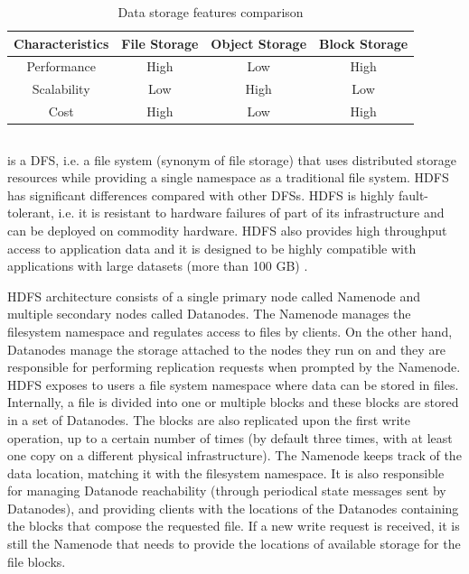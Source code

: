 \begin{table}[!ht]
    \begin{center}
      \caption{Data storage features comparison}
      \label{tab:storagecomparison}
      \begin{tabular}{cccc} %
        \toprule
        \textbf{Characteristics}\Tstrut\Bstrut & \textbf{File Storage} & \textbf{Object Storage} & \textbf{Block Storage}\\
        \midrule
        Performance & High & Low & High\Tstrut\\
        Scalability & Low & High & Low\\
        Cost & High & Low & High\Bstrut\\
        \bottomrule
      \end{tabular}
    \end{center}
\end{table}

\subsection{}

 is a \gls{DFS}, i.e. a file system (synonym of file storage) that uses distributed storage resources while providing a single namespace as a traditional file system. \gls{HDFS} has significant differences compared with other \glspl{DFS}. \gls{HDFS} is highly fault-tolerant, i.e. it is resistant to hardware failures of part of its infrastructure and can be deployed on commodity hardware. \gls{HDFS} also provides high throughput access to application data and it is designed to be highly compatible with applications with large datasets (more than 100 GB) \cite{borthakurHadoopDistributedFile2005}. 

\gls{HDFS} architecture consists of a single primary node called Namenode and multiple secondary nodes called Datanodes. The Namenode manages the filesystem namespace and regulates access to files by clients. On the other hand, Datanodes manage the storage attached to the nodes they run on and they are responsible for performing replication requests when prompted by the Namenode. \gls{HDFS} exposes to users a file system namespace where data can be stored in files. Internally, a file is divided into one or multiple blocks and these blocks are stored in a set of Datanodes. The blocks are also replicated upon the first write operation, up to a certain number of times (by default three times, with at least one copy on a different physical infrastructure). The Namenode keeps track of the data location, matching it with the filesystem namespace. It is also responsible for managing Datanode reachability (through periodical state messages sent by Datanodes), and providing clients with the locations of the Datanodes containing the blocks that compose the requested file. If a new write request is received, it is still the Namenode that needs to provide the locations of available storage for the file blocks. 

